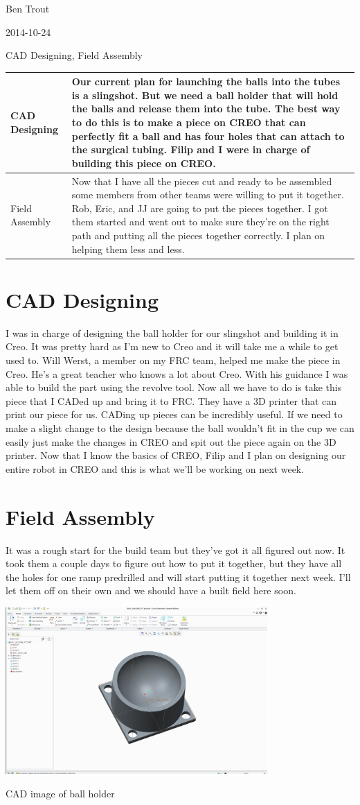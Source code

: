 Ben Trout

2014-10-24

CAD Designing, Field Assembly

\begin{tabular}{|p{5cm}|p{5cm}|}
\hline
CAD Designing&
Our current plan for launching the balls into the tubes is a slingshot. But we need a ball holder that will hold the balls and release them into the tube. The best way to do this is to make a piece on CREO that can perfectly fit a ball and has four holes that can attach to the surgical tubing. Filip and I were in charge of building this piece on CREO.
\\
\hline
Field Assembly&
Now that I have all the pieces cut and ready to be assembled some members from other teams were willing to put it together. Rob, Eric, and JJ are going to put the pieces together. I got them started and went out to make sure they're on the right path and putting all the pieces together correctly. I plan on helping them less and less.
\\
\hline
\end{tabular}

\section*{CAD Designing}
I was in charge of designing the ball holder for our slingshot and building it in Creo. It was pretty hard as I'm new to Creo and it will take me a while to get used to. Will Werst, a member on my FRC team, helped me make the piece in Creo. He's a great teacher who knows a lot about Creo. With his guidance I was able to build the part using the revolve tool. Now all we have to do is take this piece that I CADed up and bring it to FRC. They have a 3D printer that can print our piece for us. CADing up pieces can be incredibly useful. If we need to make a slight change to the design because the ball wouldn't fit in the cup we can easily just make the changes in CREO and spit out the piece again on the 3D printer. Now that I know the basics of CREO, Filip and I plan on designing our entire robot in CREO and this is what we'll be working on next week.

\section*{Field Assembly}
It was a rough start for the build team but they’ve got it all figured out now. It took them a couple days to figure out how to put it together, but they have all the holes for one ramp predrilled and will start putting it together next week. I’ll let them off on their own and we should have a built field here soon. 

\begin{center}
\includegraphics[width=10cm]{./Entries/Images/BallHolder.PNG}
\end{center}

CAD image of ball holder
